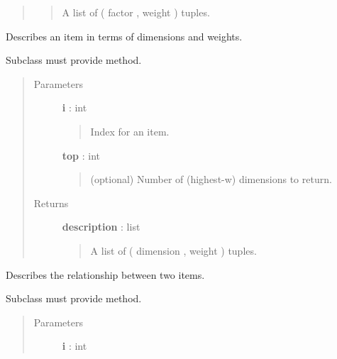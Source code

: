 \documentclass[letterpaper,10pt,english]{sphinxmanual}
\begin{document}
\begin{fulllineitems}
\begin{fulllineitems}
\begin{quote}
\begin{description}
\begin{quote}
A list of ( factor ,  weight ) tuples.
\end{quote}

\end{description}\end{quote}

\end{fulllineitems}


\begin{fulllineitems}
\label{tethne.model.corpus.dtmmodel:tethne.model.corpus.dtmmodel.DTMModel.item}
Describes an item in terms of dimensions and weights.

Subclass must provide  method.
\begin{quote}\begin{description}
\item[{Parameters}] \leavevmode
\textbf{i} : int
\begin{quote}

Index for an item.
\end{quote}

\textbf{top} : int
\begin{quote}

(optional) Number of (highest-w) dimensions to return.
\end{quote}

\item[{Returns}] \leavevmode
\textbf{description} : list
\begin{quote}

A list of ( dimension , weight ) tuples.
\end{quote}

\end{description}\end{quote}

\end{fulllineitems}


\begin{fulllineitems}
\label{tethne.model.corpus.dtmmodel:tethne.model.corpus.dtmmodel.DTMModel.item_relationship}
Describes the relationship between two items.

Subclass must provide  method.
\begin{quote}\begin{description}
\item[{Parameters}] \leavevmode
\textbf{i} : int
\begin{quote}


\end{quote}
\end{description}
\end{quote}
\end{fulllineitems}
\end{fulllineitems}
\end{document}
